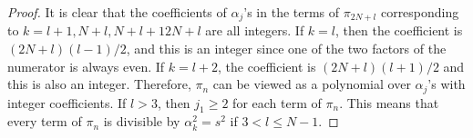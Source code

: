 \documentclass[10pt,a4paper]{amsart}
\begin{document}
\begin{proof}
It is clear that the coefficients of $\alpha_j$'s in the terms of $\pi_{2N+l}$ corresponding to $k=l+1, N+l, N+l+1 2N+l$ are all integers. If $k=l$, then the coefficient is $(2N+l)(l-1)/2$, and this is an integer since one of the two factors of the numerator is always even. If $k=l+2$, the coefficient is $(2N+l)(l+1)/2$ and this is also an integer. Therefore, $\pi_{n}$ can be viewed as a polynomial over $\alpha_j$'s with integer coefficients. If $l>3$, then $j_1\geq 2$ for each term of $\pi_n$. This means that every term of $\pi_n$ is divisible by $\alpha_k^2=s^2$ if $3<l\leq N-1$.  \end{proof}
\end{document}
